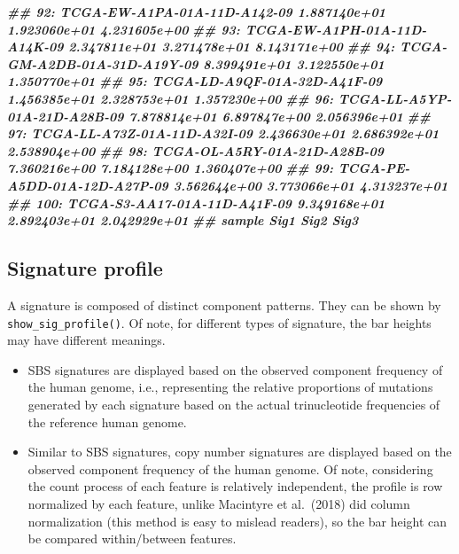 \documentclass[
  12pt,
  a4paper,
  twoside]{book}
\newenvironment{Shaded}{\begin{snugshade}}{\end{snugshade}}
\newcommand{\DocumentationTok}[1]{\textcolor[rgb]{0.56,0.35,0.01}{\textbf{\textit{#1}}}}
\providecommand{\tightlist}{%
  \setlength{\itemsep}{0pt}\setlength{\parskip}{0pt}}
\begin{document}
\begin{Shaded}
\begin{Highlighting}[]
\DocumentationTok{\#\#  92: TCGA{-}EW{-}A1PA{-}01A{-}11D{-}A142{-}09  1.887140e+01  1.923060e+01  4.231605e+00}
\DocumentationTok{\#\#  93: TCGA{-}EW{-}A1PH{-}01A{-}11D{-}A14K{-}09  2.347811e+01  3.271478e+01  8.143171e+00}
\DocumentationTok{\#\#  94: TCGA{-}GM{-}A2DB{-}01A{-}31D{-}A19Y{-}09  8.399491e+01  3.122550e+01  1.350770e+01}
\DocumentationTok{\#\#  95: TCGA{-}LD{-}A9QF{-}01A{-}32D{-}A41F{-}09  1.456385e+01  2.328753e+01  1.357230e+00}
\DocumentationTok{\#\#  96: TCGA{-}LL{-}A5YP{-}01A{-}21D{-}A28B{-}09  7.878814e+01  6.897847e+00  2.056396e+01}
\DocumentationTok{\#\#  97: TCGA{-}LL{-}A73Z{-}01A{-}11D{-}A32I{-}09  2.436630e+01  2.686392e+01  2.538904e+00}
\DocumentationTok{\#\#  98: TCGA{-}OL{-}A5RY{-}01A{-}21D{-}A28B{-}09  7.360216e+00  7.184128e+00  1.360407e+00}
\DocumentationTok{\#\#  99: TCGA{-}PE{-}A5DD{-}01A{-}12D{-}A27P{-}09  3.562644e+00  3.773066e+01  4.313237e+01}
\DocumentationTok{\#\# 100: TCGA{-}S3{-}AA17{-}01A{-}11D{-}A41F{-}09  9.349168e+01  2.892403e+01  2.042929e+01}
\DocumentationTok{\#\#                            sample          Sig1          Sig2          Sig3}
\end{Highlighting}
\end{Shaded}

\hypertarget{signature-profile}{%
\subsection{Signature profile}\label{signature-profile}}

A signature is composed of distinct component patterns. They can be shown by \texttt{show\_sig\_profile()}. Of note, for different types of signature, the bar heights may have different meanings.

\begin{itemize}
\tightlist
\item
  SBS signatures are displayed based on the observed component frequency of the human genome, i.e., representing the relative proportions of mutations generated by each signature based on the actual trinucleotide frequencies of the reference human genome.
\item
  Similar to SBS signatures, copy number signatures are displayed based on the observed component frequency of the human genome. Of note, considering the count process of each feature is relatively independent, the profile is row normalized by each feature, unlike Macintyre et al.~(2018) did column normalization (this method is easy to mislead readers), so the bar height can be compared within/between features.
\end{itemize}
\end{document}
